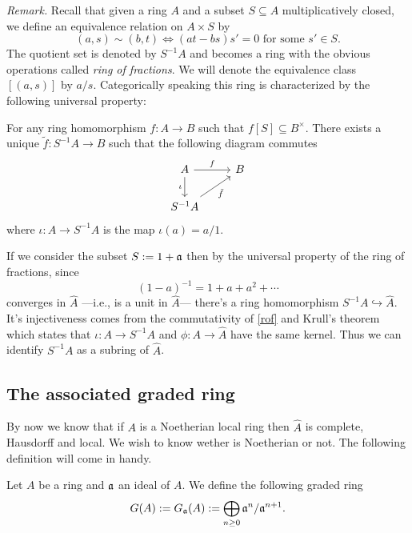 \textit{Remark.} Recall that given a ring $A$ and a subset $S\subseteq A$ multiplicatively closed, we define an equivalence relation on $A\times S$ by 
\[
(a,s)\sim (b,t) \iff (at-bs)s'=0\text{ for some }s'\in S.
\]
The quotient set is denoted by $S^{-1}A$ and becomes a ring with the obvious operations called \emph{ring of fractions}. We will denote the equivalence class $[(a,s)]$ by $a/s$. Categorically speaking this ring is characterized by the following universal property:
\begin{prop}
    For any ring homomorphism $f\colon A\to B$ such that $f[S]\subseteq B^\times$. There exists a unique $\tilde{f}\colon S^{-1}A\to B$ such that the following diagram commutes
    \begin{equation}
    \begin{tikzcd}\label{rof}
        A \ar[r, "f"] \ar[d, "\iota"'] & B \\
        S^{-1}A \ar[ru, "\tilde{f}"'] &
    \end{tikzcd}
    \end{equation}
    where $\iota\colon A\to S^{-1}A$ is the map $\iota(a)=a/1$.
\end{prop}

If we consider the subset $S:=1+\mathfrak{a}$ then by the universal property of the ring of fractions, since 
\[
(1-a)^{-1}=1+a+a^2+\cdots
\]
converges in $\hat A$ ---i.e., is a unit in $\hat A$--- there's a ring homomorphism $S^{-1}A\hookrightarrow \hat A$. It's injectiveness comes from the commutativity of \eqref{rof} and Krull's theorem which states that $\iota\colon A\to S^{-1}A$ and $\phi\colon A\to \hat A$ have the same kernel. Thus we can identify $S^{-1}A$ as a subring of $\hat A$.

\subsection{The associated graded ring}

By now we know that if $A$ is a Noetherian local ring then $\hat A$ is complete, Hausdorff and local. We wish to know wether is Noetherian or not. The following definition will come in handy.
\begin{defi}
    Let $A$ be a ring and $\mathfrak{a}$ an ideal of $A$. We define the following graded ring
    \[
    G(A):= G_{\mathfrak{a}} (A):=\bigoplus_{n\geq 0}\mathfrak{a}^n/\mathfrak{a}^{n+1}.
    \]
\end{defi}

